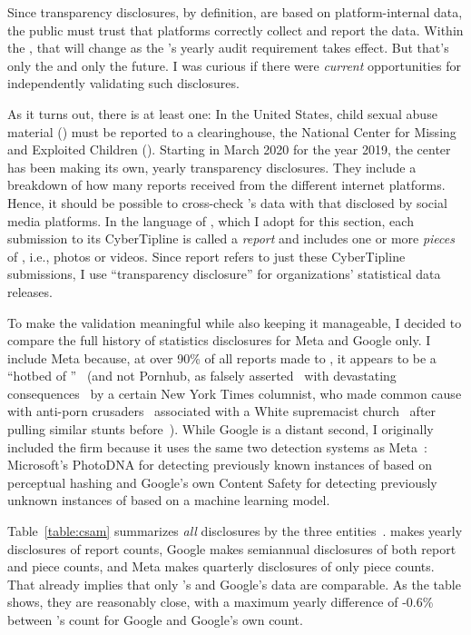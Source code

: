 Since transparency disclosures, by definition, are based on platform-internal
data, the public must trust that platforms correctly collect and report the
data. Within the , that will change as the 's yearly audit requirement
takes effect. But that's only the  and only the future. I was curious if
there were \emph{current} opportunities for independently validating such
disclosures.

As it turns out, there is at least one: In the United States, child sexual abuse
material () must be reported to a clearinghouse, the National Center for
Missing and Exploited Children (). Starting in March 2020 for the year
2019, the center has been making its own, yearly transparency disclosures. They
include a breakdown of how many reports  received from the different
internet platforms. Hence, it should be possible to cross-check 's data
with that disclosed by social media platforms. In the language of , which
I adopt for this section, each submission to its CyberTipline is called a
\emph{report} and includes one or more \emph{pieces} of , i.e., photos or
videos. Since report refers to just these CyberTipline submissions, I use
``transparency disclosure'' for organizations' statistical data releases.

To make the validation meaningful while also keeping it manageable, I decided to
compare the full history of  statistics disclosures for Meta and
Google only. I include Meta because, at over 90\% of all reports made to ,
it appears to be a ``hotbed of ''~\cite{Hitt2021} (and not Pornhub, as
falsely asserted~\cite{Brown2020,Grant2020} with devastating
consequences~\cite{Celarier2021,Dickson2020,Harris2021,Stoya2021,GagliardoSilver2021}
by a certain New York Times columnist, who made common cause with anti-porn
crusaders~\cite{Hitt2020a} associated with a White supremacist
church~\cite{Halley2021,ProducerX2020} after pulling similar stunts
before~\cite{Bass2014,Brown2019,Dickson2014,Martin2012,Masnick2017,McCormack2012,Talusan2017}).
While Google is a distant second, I originally included the firm because it uses
the same two  detection systems as Meta~\cite{Allen2011,Davis2018}:
Microsoft's PhotoDNA for detecting previously known instances of  based on
perceptual hashing and Google's own Content Safety  for detecting
previously unknown instances of  based on a machine learning model.

Table~\ref{table:csam} summarizes \emph{all}  disclosures by the three
entities~\cite{NcmecByPlatform2019,NcmecByPlatform2020,NcmecByPlatform2021}.
 makes yearly disclosures of report counts, Google makes semiannual
disclosures of both report and piece counts, and Meta makes quarterly
disclosures of only piece counts. That already implies that only 's and
Google's data are comparable. As the table shows, they are reasonably close,
with a maximum yearly difference of -0.6\% between 's count for Google and
Google's own count.

